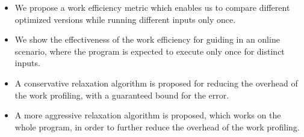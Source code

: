     \begin{itemize}[leftmargin=3mm]

        \item We propose a work efficiency metric which enables us to compare different optimized versions while running different inputs
        only once.

        \item We show the effectiveness of the work efficiency for guiding {\itercomp} in an online scenario, where the program is expected
        to execute only once for distinct inputs.

        \item A conservative relaxation algorithm is proposed for reducing the overhead of the work profiling, with a guaranteed bound for
        the error.

        \item A more aggressive relaxation algorithm is proposed, which works on the whole program, in order to further reduce the overhead
        of the work profiling.
    \end{itemize}
